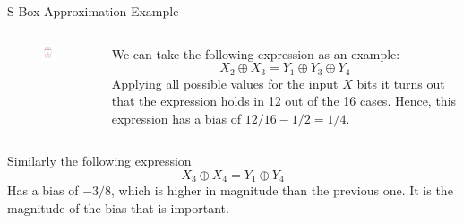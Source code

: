 \documentclass[9pt]{beamer}
\begin{document}
\begin{frame}
S-Box Approximation Example

\vspace{5mm}
\begin{columns}
\begin{column}{0.3\textwidth}
\begin{figure}
\includegraphics[width=0.7\textwidth]{spn_sbox_X23_Y134.PNG}
\end{figure}
\end{column}

\begin{column}{0.7\textwidth}
We can take the following expression as an example:
\[ X_2 \oplus X_3 = Y_1 \oplus Y_3 \oplus Y_4 \]
\pause Applying all possible values for the input $X$ bits it turns out that the expression holds in 12 out of the 16 cases. \pause Hence, this expression has a bias of $12/16 - 1/2 = 1/4$.
\end{column}
\end{columns}

\vspace{5mm}
\pause Similarly the following expression
\[ X_3 \oplus X_4 = Y_1 \oplus Y_4 \]
Has a bias of $-3/8$, which is higher in magnitude than the previous one. \pause It is the magnitude of the bias that is important.
\end{frame}
\end{document}
